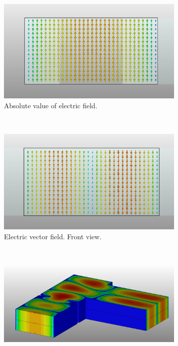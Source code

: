 \documentclass[english,twoside]{article}
\begin{document}
		\newpage
		\begin{landscape}
			\begin{figure}
				\centering
				\begin{subfigure}[b]{0.45\textwidth}
					\includegraphics[width=\textwidth]{figures/wrToWrTE20_input}
					\caption{Absolute value of electric field.}
				\end{subfigure}
				~
				\begin{subfigure}[b]{0.45\textwidth}
					\includegraphics[width=\textwidth]{figures/wrToWrTE20_output}
					\caption{Electric vector field. Front view.}
				\end{subfigure}
				\vspace{10pt}\newline
				~
				\begin{subfigure}[b]{.6\textwidth}
					\includegraphics[width=\textwidth]{figures/wrToWrTE20_abs}

\end{subfigure}
\end{figure}
\end{landscape}
\end{document}
